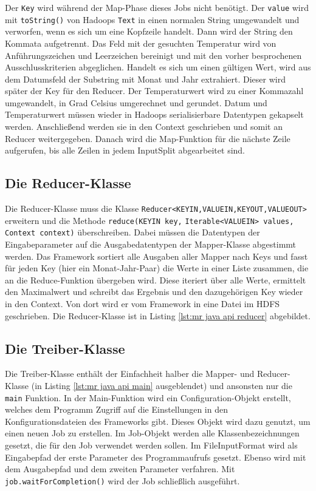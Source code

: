 

Der \verb|Key| wird während der Map-Phase dieses Jobs nicht benötigt. Der \verb|value| wird mit \verb|toString()| von Hadoops \verb|Text| in einen normalen String umgewandelt und verworfen, wenn es sich um eine Kopfzeile handelt. Dann wird der String den Kommata aufgetrennt. Das Feld mit der gesuchten Temperatur wird von Anführungszeichen und Leerzeichen bereinigt und mit den vorher besprochenen Ausschlusskriterien abgeglichen. Handelt es sich um einen gültigen Wert, wird aus dem Datumsfeld der Substring mit Monat und Jahr extrahiert. Dieser wird später der Key für den Reducer. Der Temperaturwert wird zu einer Kommazahl umgewandelt, in Grad Celsius umgerechnet und gerundet. Datum und Temperaturwert müssen wieder in Hadoops serialisierbare Datentypen gekapselt werden. Anschließend werden sie in den Context geschrieben und somit an Reducer weitergegeben. Danach wird die Map-Funktion für die nächste Zeile aufgerufen, bis alle Zeilen in jedem InputSplit abgearbeitet sind.

\subsection{Die Reducer-Klasse}
Die Reducer-Klasse muss die Klasse \verb|Reducer<KEYIN,VALUEIN,KEYOUT,VALUEOUT>| erweitern und die Methode \verb|reduce(KEYIN key,| \verb|Iterable<VALUEIN> values, Context context)| überschreiben. Dabei müssen die Datentypen der Eingabeparameter auf die Ausgabedatentypen der Mapper-Klasse abgestimmt werden. Das Framework sortiert alle Ausgaben aller Mapper nach Keys und fasst für jeden Key (hier ein Monat-Jahr-Paar) die Werte in einer Liste zusammen, die an die Reduce-Funktion übergeben wird. Diese iteriert über alle Werte, ermittelt den Maximalwert und schreibt das Ergebnis und den dazugehörigen Key wieder in den Context. Von dort wird er vom Framework in eine Datei im HDFS geschrieben. Die Reducer-Klasse ist in Listing \ref{lst:mr java api reducer} abgebildet.



\subsection{Die Treiber-Klasse}
Die Treiber-Klasse enthält der Einfachheit halber die Mapper- und Reducer-Klasse (in Listing \ref{lst:mr java api main} ausgeblendet) und ansonsten nur die \verb|main| Funktion. In der Main-Funktion wird ein Configuration-Objekt erstellt, welches dem Programm Zugriff auf die Einstellungen in den Konfigurationsdateien des Frameworks gibt. Dieses Objekt wird dazu genutzt, um einen neuen Job zu erstellen. Im Job-Objekt werden alle Klassenbezeichnungen gesetzt, die für den Job verwendet werden sollen. Im FileInputFormat wird als Eingabepfad der erste Parameter des Programmaufrufs gesetzt. Ebenso wird mit dem Ausgabepfad und dem zweiten Parameter verfahren. Mit \verb|job.waitForCompletion()| wird der Job schließlich ausgeführt. 

